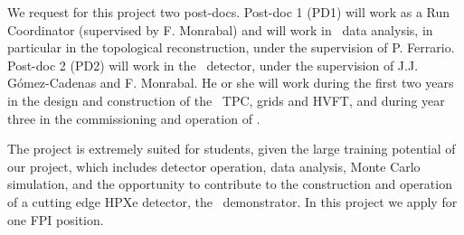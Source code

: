 We request for this project two post-docs. Post-doc 1 (PD1) will work as a Run Coordinator (supervised by F. Monrabal) and will work in \Next\ data analysis, in particular in the topological reconstruction, under the supervision of P. Ferrario. Post-doc 2 (PD2) will work in the \HDEMO\ detector, under the supervision of J.J. G\'omez-Cadenas and F. Monrabal. He or she will work during the first two years in the design and construction of the
\HDEMO\ TPC, grids and HVFT, and during year three in the commissioning and operation of \NHD. 

The project is extremely suited for students, given the large training potential of our project, which includes detector operation, data analysis, Monte Carlo simulation, and the opportunity to contribute to the construction and operation of a cutting edge HPXe detector, the \HDEMO\ demonstrator. In this project we apply for one FPI position. 
